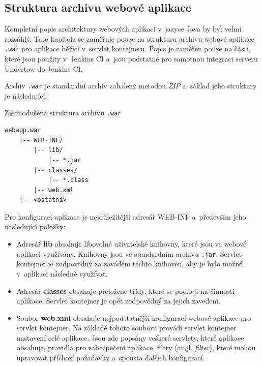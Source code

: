         \subsection{Struktura archivu webové aplikace} \label{kapWebXml}
            Kompletní popis architektury webových aplikací v~jazyce Java by byl velmi rozsáhlý. 
            Tato kapitola se zaměřuje pouze na strukturu archivu webové aplikace \texttt{.war} pro aplikace běžící v~servlet kontejneru.
            Popis je zaměřen pouze na části, které jsou použity v~Jenkins CI a~jsou podstatné
            pro samotnou integraci serveru Undertow do Jenkins CI.

            \medskip
            Archiv \texttt{.war} je standardní archiv zabalený metodou \emph{ZIP} a~základ jeho struktury je následující:
            
\begin{priklad} Zjednodušená struktura archivu \texttt{.war}
\begin{verbatim}
webapp.war
    |-- WEB-INF/
        |-- lib/
            |-- *.jar
        |-- classes/
            |-- *.class
        |-- web.xml
    |-- <ostatní>
\end{verbatim}
\end{priklad}


            Pro konfiguraci aplikace je nejdůležitější adresář WEB-INF a~především jeho následující položky:

            \begin{itemize}
                \item Adresář \textbf{lib} obsahuje libovolné uživatelské knihovny, které jsou ve webové aplikaci využívány. 
                    Knihovny jsou ve standardním archivu \texttt{.jar}.
                    Servlet kontejner je zodpovědný za zavádění těchto knihoven, aby je bylo možné v~aplikaci následně využívat.

                \item Adresář \textbf{classes} obsahuje přeložené třídy, které se podílejí na činnosti aplikace. 
                    Servlet kontejner je opět zodpovědný za jejich zavedení. 

                \item Soubor \textbf{web.xml} obsahuje nejpodstatnější konfiguraci webové aplikace pro servlet kontejner.
                    Na základě tohoto souboru provádí servlet kontejner nastavení celé aplikace.
                    Jsou zde popsány veškeré servlety, které aplikace obsahuje, pravidla pro zabezpečení aplikace,
                    filtry (angl. \emph{filter}), které mohou upravovat příchozí požadavky a~spousta dalších konfigurací. 
            \end{itemize}

